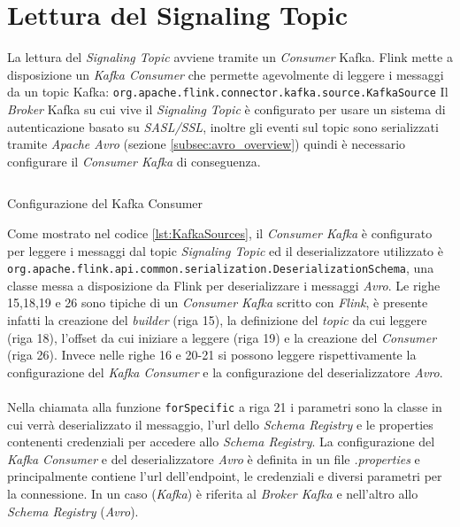 \section{Lettura del Signaling Topic}
\label{sec:LetturaDelSignalingTopic}
La lettura del \textit{Signaling Topic} avviene tramite un \textit{Consumer} Kafka.
Flink mette a disposizione un \textit{Kafka Consumer} 
che permette agevolmente di leggere i messaggi da un topic Kafka: \texttt{org.apache.flink.connector.kafka.source.KafkaSource}
Il \textit{Broker} Kafka su cui vive il \textit{Signaling Topic} è configurato per usare un sistema di autenticazione basato su \textit{SASL/SSL},
inoltre gli eventi sul topic sono serializzati tramite \textit{Apache Avro} (sezione \ref{subsec:avro_overview}) quindi è necessario configurare il \textit{Consumer Kafka} di conseguenza.
\begin{code}
    \inputminted[linenos]{java}{listings/EventsExport/KafkaSources.java}
    \caption{Configurazione del Kafka Consumer}
    \label{lst:KafkaSources}
\end{code}
Come mostrato nel codice \ref{lst:KafkaSources}, il \textit{Consumer Kafka} è configurato per leggere i messaggi dal topic \textit{Signaling Topic} 
ed il deserializzatore utilizzato è\\ \texttt{org.apache.flink.api.common.serialization.DeserializationSchema},
una classe messa a disposizione da Flink per deserializzare i messaggi \textit{Avro}.
Le righe 15,18,19 e 26 sono tipiche di un \textit{Consumer Kafka} scritto con \textit{Flink}, è presente infatti la creazione del \textit{builder} (riga 15),
la definizione del \textit{topic} da cui leggere (riga 18), l'offset da cui iniziare a leggere (riga 19) e  la creazione del \textit{Consumer} (riga 26).
Invece nelle righe 16 e 20-21 si possono leggere rispettivamente la configurazione del \textit{Kafka Consumer} e la configurazione del deserializzatore \textit{Avro}.\\\\
Nella chiamata alla funzione \texttt{forSpecific} a riga 21 i parametri sono la classe in cui verrà deserializzato il messaggio, l'url dello \textit{Schema Registry}
e le properties contenenti credenziali per accedere allo \textit{Schema Registry}. 
La configurazione del \textit{Kafka Consumer} e del deserializzatore \textit{Avro} è definita in un file \textit{.properties} e principalmente contiene
l'url dell'endpoint, le credenziali e diversi parametri per la connessione.
In un caso (\textit{Kafka}) è riferita al \textit{Broker Kafka} e nell'altro allo \textit{Schema Registry} (\textit{Avro}).
